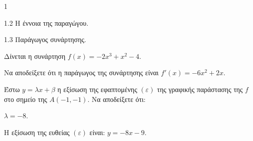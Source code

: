 \begin{ylh}{1}
    \item 1.2 Η έννοια της παραγώγου.
    \item 1.3 Παράγωγος συνάρτησης.
\end{ylh}
Δίνεται η συνάρτηση $f(x)=-2x^3+x^2-4$.
\begin{alist}
    \item Να αποδείξετε ότι η παράγωγος της συνάρτησης είναι $f'(x)=-6x^2+2x$. 
\end{alist}
Έστω $y=\lambda x+\beta$ η εξίσωση της εφαπτομένης $(\varepsilon)$ της γραφικής παράστασης της $f$ στο σημείο της $Α(-1,-1)$. Να αποδείξετε ότι:
\begin{alist}
    \item $\lambda=-8$. 
    \item Η εξίσωση της ευθείας $(\varepsilon)$ είναι: $y=-8x-9$. 
\end{alist}

